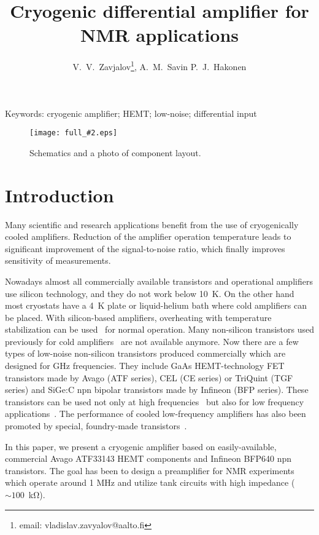 \documentclass{twocol}
\title{Cryogenic differential amplifier for NMR applications}
\author {
  V.~V.~Zavjalov\/\thanks{email: vladislav.zavyalov@aalto.fi},
  A.~M.~Savin
  P.~J.~Hakonen
}
\newcommand{\image}[3]{
\begin{figure}[#1]
\begin{center}
\texttt{[image: full\_\#2.eps]}
\caption{\small#3}
\label{image:#2}
\end{center}
\end{figure}
}
\begin{document}
\maketitle

Keywords: cryogenic amplifier; HEMT; low-noise; differential input

\image{h!}{amp1}{Schematics and a photo of component layout.}

\section{Introduction}

Many scientific and research applications benefit from the use of
cryogenically cooled amplifiers. Reduction of the amplifier operation
temperature leads to significant improvement of the signal-to-noise
ratio, which finally improves sensitivity of measurements.

Nowadays almost all commercially available transistors and operational
amplifiers use silicon technology, and they do not work below 10~K. On
the other hand most cryostats have a 4~K plate or liquid-helium bath
where cold amplifiers can be placed. With silicon-based amplifiers,
overheating with temperature stabilization can be
used~\cite{2009_hayashi} for normal operation. Many non-silicon
transistors used previously for cold amplifiers~\cite{1985_bloyet} are
not available anymore. Now there are a few types of low-noise non-silicon
transistors produced commercially which are designed for GHz frequencies.
They include GaAs HEMT-technology FET transistors made by Avago (ATF
series), CEL (CE series) or TriQuint (TGF series) and SiGe:C npn bipolar
transistors made by Infineon (BFP series). These transistors can be used
not only at high
frequencies~\cite{2005_pospieszalski,2004_roschier,2005_hu} but also for
low frequency
applications~\cite{2000_koivuniemi,2004_oukhanski,2004_robinson,2006_dicarlo,2008_mathur,2012_beev,2013_arakawa,2017_hirata}.
The performance of cooled low-frequency  amplifiers has also been
promoted by special, foundry-made transistors~\cite{2014_dong}.

In this paper, we present a cryogenic amplifier based on easily-available, commercial Avago ATF33143 HEMT components
and Infineon BFP640 npn transistors. The goal has been to design 
a preamplifier for NMR experiments which operate around 1 MHz 
 and utilize tank circuits with high impedance ($\sim 100$~k$\mathrm{\Omega}$).
\end{document}
